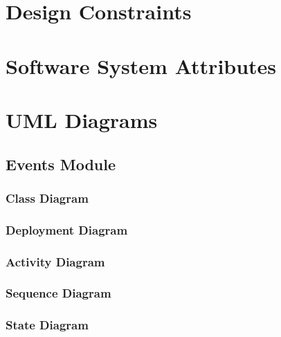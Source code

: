 \documentclass{article}
\begin{document}
		
		
	\clearpage

	\section{Design Constraints}\label{sec:design-constraints}
	
		

	\clearpage
	
	\section{Software System Attributes}\label{sec:design-constraints}
	
			

	\clearpage
	
	\section{UML Diagrams}\label{sec:uml-diagrams}
	
		
		\subsection{Events Module}\label{subsec:uml-diagrams-events}
		
		
			\subsubsection{Class Diagram}\label{subsec:uml-diagrams-events-class}
			
			
			\subsubsection{Deployment Diagram}\label{subsec:uml-diagrams-events-dep}
			
			
			\subsubsection{Activity Diagram}\label{subsec:uml-diagrams-events-act}
			
			
			\subsubsection{Sequence Diagram}\label{subsec:uml-diagrams-events-seq}
						
			
			\subsubsection{State Diagram}\label{subsec:uml-diagrams-events-state}
			
\end{document}
